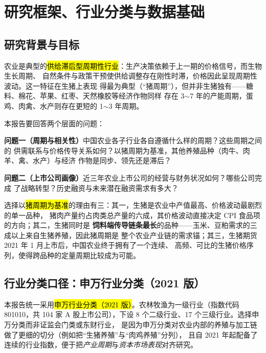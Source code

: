 \section{研究框架、行业分类与数据基础}
\label{sec:framework}

\subsection{研究背景与目标}
\label{sec:fw-background}

农业是典型的\hl{供给滞后型周期性行业}：生产决策依赖于上一期的价格信号，而生物生长周期、
自然条件与政策干预使供给调整存在刚性时滞，价格因此呈现周期性波动。这一特征在生猪上表现
得最为典型（“猪周期”），但并非生猪独有——糖料、棉花、苹果、红枣、天然橡胶等经济作物同样
存在 3$\sim$7 年的产能周期，蛋鸡、肉禽、水产则存在更短的 1$\sim$3 年周期。

本报告要回答两个层面的问题：

\begin{keybox}[报告的两个核心问题]
\normalsize
\textbf{问题一（周期与相关性）}\quad 中国农业各子行业各自遵循什么样的周期？这些周期之间的
供需联系与价格传导关系如何？以猪周期为基准，其他养殖品种（肉牛、肉羊、禽、水产）与经济
作物是同步、领先还是滞后？\par\vspace{4pt}
\textbf{问题二（上市公司画像）}\quad 近三年农业上市公司的经营与财务状况如何？哪些公司完成
了战略转型？历史融资与未来潜在融资需求有多大？
\end{keybox}

选择以\hl{猪周期为基准}的理由有三：其一，生猪是农业中产值最高、价格波动最剧烈的单一品种，
猪肉产量约占肉类总产量的六成，其价格波动直接决定 CPI 食品项的方向；其二，生猪同时是
\textbf{饲料端传导链条最长}的品种——玉米、豆粕需求的三成以上来自生猪养殖，因此猪周期是
整个农业产业链的需求锚；其三，生猪期货 2021 年 1 月上市后，中国农业终于拥有了一个连续、
高频、可比的生猪价格序列，使得跨品种的定量周期比较成为可能。

\subsection{行业分类口径：申万行业分类（2021 版）}
\label{sec:fw-classification}

本报告统一采用\hl{申万行业分类（2021 版）}。农林牧渔为一级行业（指数代码 801010，共 104 家
A 股上市公司），下设 8 个二级行业、17 个三级行业。选择申万分类而非证监会门类或东财行业，
是因为申万分类对农业内部的养殖与加工链做了更细的切分（例如把“生猪养殖”与“肉鸡养殖”分列），
且自 2021 年起配备了连续的行业指数，便于把\emph{产业周期}与\emph{资本市场表现}对齐研究。

